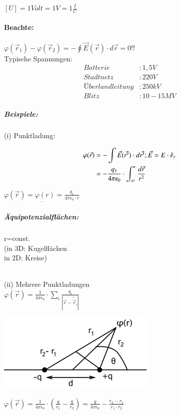 \documentclass[11pt]{article}
\begin{document}
$[U]= 1Volt = 1V = 1\frac{I}{C}$\\

\paragraph{Beachte:} $ \varphi(\vec{r}_1)-\varphi(\vec{r}_2) = -{\displaystyle\oint} \vec{E}(\vec{r})\cdot d\vec{r}= 0!!$\\

Typische Spannungen:
\begin{align*}
	Batterie&: 1,5V\\
	Stadtnetz&: 220V\\
	Überlandleitung&: 250kV\\
	Blitz&: 10-15MV
\end{align*}

\subparagraph{Beispiele:}

(i) Punktladung:

\begin{align*}
	\displaystyle \varphi(\vec{r})&= -\int \vec{E}(\vec{r'})\cdot d\vec{r'}; \vec{E}=E\cdot\hat{e}_r\\
	\displaystyle &=-\frac{q_1}{4\pi\epsilon_0}\cdot\int_{\infty}^{r} \frac{d\vec{r}}{r^2}
\end{align*}

$\underline{\varphi(\vec{r})=\varphi(r)=\frac{q_1}{4\pi\epsilon_0\cdot r}}$\\

\subparagraph{Äquipotenzialflächen:} r=const.\\
(in 3D: Kugelflächen\\
in 2D: Kreise)

\hfill\\

(ii) Mehrere Punktladungen\\

$\displaystyle\varphi(\vec{r})=\frac{1}{4\pi\epsilon_0}\cdot\sum_{i} \frac{q_i}{|\vec{r}-\tilde{\vec{r}}_i|}$

\includegraphics{skizzen/14/14_7B0}

$ \varphi(\vec{r})=\frac{1}{4\pi\epsilon_0}\cdot(\frac{q}{r_1}-\frac{q}{r_2})=\frac{q}{4\pi\epsilon_0}-\frac{r_2-r_1}{r_1\cdot r_2} $
\end{document}
